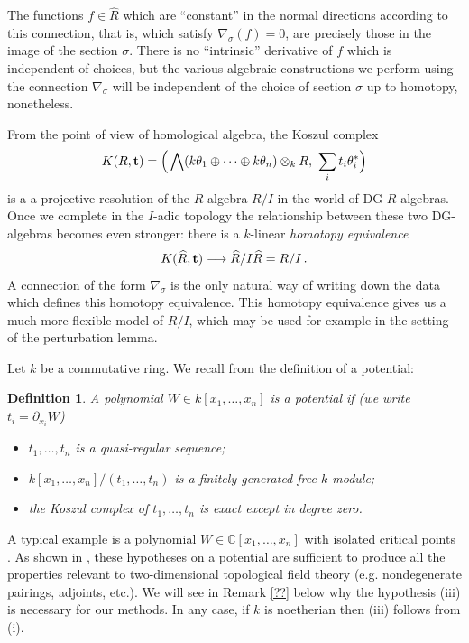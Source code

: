 \documentclass[english,letter paper,12pt,leqno]{article}
\theoremstyle{example}
\newtheorem{definition}[theorem]{Definition}
\numberwithin{equation}{section}
\begin{document}
The functions $f \in \widehat{R}$ which are ``constant'' in the normal directions according to this connection, that is, which satisfy $\nabla_\sigma(f) = 0$, are precisely those in the image of the section $\sigma$. There is no ``intrinsic'' derivative of $f$ which is independent of choices, but the various algebraic constructions we perform using the connection $\nabla_\sigma$ will be independent of the choice of section $\sigma$ up to homotopy, nonetheless.

From the point of view of homological algebra, the Koszul complex 
\[
K(R, \bold{t}) = \Big( \bigwedge( k \theta_1 \oplus \cdots \oplus k \theta_n ) \otimes_k R, \,\,\sum_i t_i \theta_i^* \Big)
\]
is a a projective resolution of the $R$-algebra $R/I$ in the world of DG-$R$-algebras. Once we complete in the $I$-adic topology the relationship between these two DG-algebras becomes even stronger: there is a $k$-linear \emph{homotopy equivalence}
\[
K(\widehat{R}, \bold{t}) \longrightarrow \widehat{R}/I\widehat{R} = R/I\,.
\]
A connection of the form $\nabla_\sigma$ is the only natural way of writing down the data which defines this homotopy equivalence. This homotopy equivalence gives us a much more flexible model of $R/I$, which may be used for example in the setting of the perturbation lemma.

Let $k$ be a commutative ring. We recall from \cite{lgdual} the definition of a potential:

\begin{definition}\label{defn:potential} A polynomial $W \in k[x_1,\ldots,x_n]$ is a \textsl{potential} if (we write $t_i = \partial_{x_i} W$)
\begin{itemize}
\item[(i)] $t_1,\ldots,t_n$ is a quasi-regular sequence;
\item[(ii)] $k[x_1,\ldots,x_n]/(t_1,\ldots,t_n)$ is a finitely generated free $k$-module;
\item[(iii)] the Koszul complex of $t_1,\ldots,t_n$ is exact except in degree zero.
\end{itemize}
\end{definition}

A typical example is a polynomial $W \in \mathbb{C}[x_1,\ldots,x_n]$ with isolated critical points \cite[Example ??]{lgdual}. As shown in \cite{lgdual}, these hypotheses on a potential are sufficient to produce all the properties relevant to two-dimensional topological field theory (e.g. nondegenerate pairings, adjoints, etc.). We will see in Remark \ref{??} below why the hypothesis (iii) is necessary for our methods. In any case, if $k$ is noetherian then (iii) follows from (i).
\end{document}
